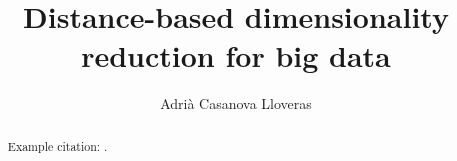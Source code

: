 \documentclass[a4paper,12pt]{article}
\title{Distance-based dimensionality reduction for big data}
\author{Adrià Casanova Lloveras}
\begin{document}


\begin{abstract}
    Example citation: \cite{Rdimtools}.
\end{abstract}
\pagebreak

\tableofcontents
\pagebreak


\pagebreak


\pagebreak


\pagebreak


\pagebreak


\pagebreak


\pagebreak


\pagebreak

\printbibliography
\pagebreak


\pagebreak
\end{document}
